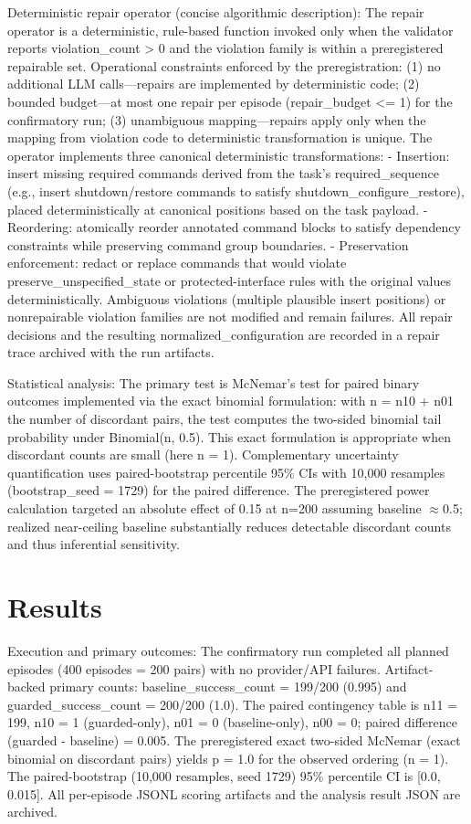 \documentclass[conference]{IEEEtran}
\begin{document}
Deterministic repair operator (concise algorithmic description): The repair operator is a deterministic, rule-based function invoked only when the validator reports violation\_count > 0 and the violation family is within a preregistered repairable set. Operational constraints enforced by the preregistration: (1) no additional LLM calls---repairs are implemented by deterministic code; (2) bounded budget---at most one repair per episode (repair\_budget <= 1) for the confirmatory run; (3) unambiguous mapping---repairs apply only when the mapping from violation code to deterministic transformation is unique. The operator implements three canonical deterministic transformations:
- Insertion: insert missing required commands derived from the task's required\_sequence (e.g., insert shutdown/restore commands to satisfy shutdown\_configure\_restore), placed deterministically at canonical positions based on the task payload.
- Reordering: atomically reorder annotated command blocks to satisfy dependency constraints while preserving command group boundaries.
- Preservation enforcement: redact or replace commands that would violate preserve\_unspecified\_state or protected-interface rules with the original values deterministically.
Ambiguous violations (multiple plausible insert positions) or nonrepairable violation families are not modified and remain failures. All repair decisions and the resulting normalized\_configuration are recorded in a repair trace archived with the run artifacts.

Statistical analysis: The primary test is McNemar's test for paired binary outcomes implemented via the exact binomial formulation: with n = n10 + n01 the number of discordant pairs, the test computes the two-sided binomial tail probability under Binomial(n, 0.5). This exact formulation is appropriate when discordant counts are small (here n = 1). Complementary uncertainty quantification uses paired-bootstrap percentile 95\% CIs with 10,000 resamples (bootstrap\_seed = 1729) for the paired difference. The preregistered power calculation targeted an absolute effect of 0.15 at n=200 assuming baseline \ensuremath{\approx}0.5; realized near-ceiling baseline substantially reduces detectable discordant counts and thus inferential sensitivity.

\section{Results}
Execution and primary outcomes: The confirmatory run completed all planned episodes (400 episodes = 200 pairs) with no provider/API failures. Artifact-backed primary counts: baseline\_success\_count = 199/200 (0.995) and guarded\_success\_count = 200/200 (1.0). The paired contingency table is n11 = 199, n10 = 1 (guarded-only), n01 = 0 (baseline-only), n00 = 0; paired difference (guarded - baseline) = 0.005. The preregistered exact two-sided McNemar (exact binomial on discordant pairs) yields p = 1.0 for the observed ordering (n = 1). The paired-bootstrap (10,000 resamples, seed 1729) 95\% percentile CI is [0.0, 0.015]. All per-episode JSONL scoring artifacts and the analysis result JSON are archived.
\end{document}
